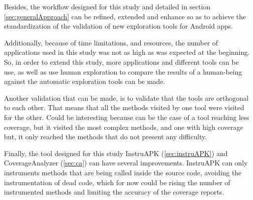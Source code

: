 Besides, the workflow designed for this study and detailed in section \ref{sec:generalApproach} can be refined, extended and enhance so as to achieve the standardization of the validation of new exploration tools for Android apps. 

Additionally, because of time limitations, and resources, the number of applications used in this study was not as high as was expected at the beginning. So, in order to extend this study, more applications and different tools can be use, as well as use human exploration to compare the results of a human-being against the automatic exploration tools can be made.

Another validation that can be made, is to validate that the tools are orthogonal to each other. That means that all the methods visited by one tool were visited for the other. Could be interesting because can be the case of a tool reaching less coverage, but it visited the most complex methods, and one with high coverage but, it only reached the methods that do not present any difficulty. 

Finally, the tool designed for this study InstruAPK (\ref{sec:instruAPK}) and CoverageAnalyzer (\ref{sec:ca}) can have several improvements. InstruAPK can only instruments methods that are being called inside the source code, avoiding the instrumentation of dead code, which for now could be rising the number of instrumented methods and limiting the accuracy of the coverage reports.
